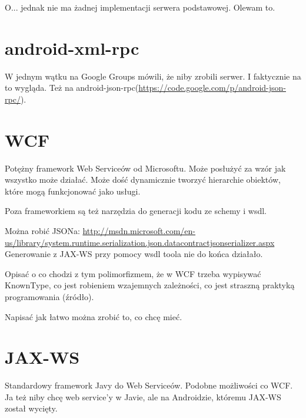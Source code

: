 O... jednak nie ma żadnej implementacji serwera podstawowej. Olewam to.



\section{android-xml-rpc}
W jednym wątku na Google Groups \cite{android-rpc-thread} mówili, że niby zrobili serwer. I faktycznie na to wygląda.
Też na android-json-rpc(\url{https://code.google.com/p/android-json-rpc/}).



\section{WCF}
Potężny framework Web Serviceów od Microsoftu. Może posłużyć za wzór jak wszystko może działać. Może dość dynamicznie tworzyć hierarchie obiektów, które mogą funkcjonować jako usługi.

Poza frameworkiem są też narzędzia do generacji kodu ze schemy i wsdl.

Można robić JSONa: \url{http://msdn.microsoft.com/en-us/library/system.runtime.serialization.json.datacontractjsonserializer.aspx}\\

Generowanie z JAX-WS przy pomocy wsdl toola nie do końca działało.

Opisać o co chodzi z tym polimorfizmem, że w WCF trzeba wypisywać KnownType, co jest robieniem wzajemnych zależności, co jest straszną praktyką programowania (źródło).

Napisać jak łatwo można zrobić to, co chcę mieć.




\section{JAX-WS}
Standardowy framework Javy do Web Serviceów. Podobne możliwości co WCF\@. Ja też niby chcę web service'y w Javie, ale na Androidzie, któremu JAX-WS został wycięty.

